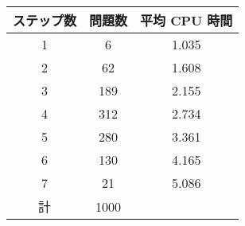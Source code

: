 \begin{tabular}{|c|c|c|}
ステップ数 & 問題数 & 平均 CPU 時間 \\ \hline
1 & 6 & 1.035 \\
2 & 62 & 1.608 \\
3 & 189 & 2.155 \\
4 & 312 & 2.734 \\
5 & 280 & 3.361 \\
6 & 130 & 4.165 \\
7 & 21 & 5.086 \\ \hline
計 & 1000 & \\
\end{tabular}
